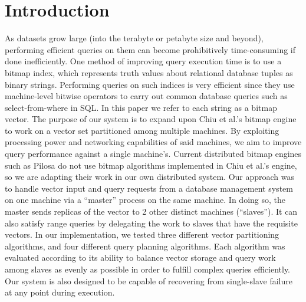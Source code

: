 \section{Introduction}
As datasets grow large (into the terabyte or petabyte size and beyond), performing efficient queries on them can become prohibitively time-consuming if done inefficiently.
One method of improving query execution time is to use a bitmap index, which represents truth values about relational database tuples as binary strings.
Performing queries on such indices is very efficient since they use machine-level bitwise operators to carry out common database queries such as select-from-where in SQL.
In this paper we refer to each string as a bitmap vector.
The purpose of our system is to expand upon Chiu et al.'s bitmap engine to work on a vector set partitioned among multiple machines.
By exploiting processing power and networking capabilities of said machines, we aim to improve query performance against a single machine’s.
Current distributed bitmap engines such as Pilosa do not use bitmap algorithms implemented in Chiu et al.’s engine, so we are adapting their work in our own distributed system.
Our approach was to handle vector input and query requests from a database management system on one machine via a ``master'' process on the same machine.
In doing so, the master sends replicas of the vector to 2 other distinct machines (``slaves'').
It can also satisfy range queries by delegating the work to slaves that have the requisite vectors.
In our implementation, we tested three different vector partitioning algorithms, and four different query planning algorithms.
Each algorithm was evaluated according to its ability to balance vector storage and query work among slaves as evenly as possible in order to fulfill complex queries efficiently.
Our system is also designed to be capable of recovering from single-slave failure at any point during execution.
